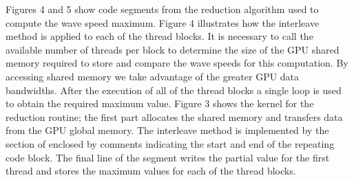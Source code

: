  Figures 4  and 5 show code segments from the reduction algorithm used to compute the wave speed maximum. Figure 4 illustrates how the interleave method is applied to each of the thread blocks. It is necessary to call the available number of threads per block to determine the size of the GPU shared memory required to store and compare the wave speeds for this computation. By accessing shared memory we take advantage of the greater GPU data bandwidths. After the execution of all of the thread blocks a single loop is used to obtain the required maximum value. Figure 3 shows the kernel  for the reduction  routine; the first part allocates the shared memory and transfers data from the GPU global memory. The interleave
method is implemented by the section of enclosed by comments indicating the start and end of the repeating code block. The final line of the segment writes the partial value for the first thread and stores the maximum values for each of the thread blocks.\\ 



